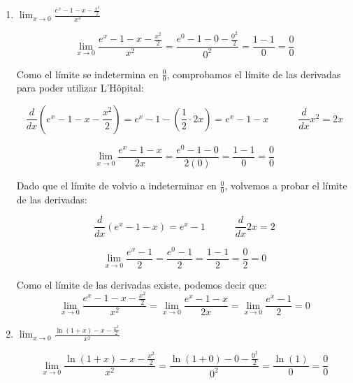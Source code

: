 \documentclass[12pt]{article}
\begin{document}
\begin{enumerate}[\hspace{9px} a)]
    \item \(\displaystyle\lim_{x \to 0}\frac{e^x-1-x-\frac{x^2}{2}}{x^3}\)
    
        \begin{equation*}
            \lim_{x \to 0}\frac{e^x-1-x-\frac{x^2}{2}}{x^2} = \frac{e^0-1-0-\frac{0^2}{2}}{0^2} = \frac{1-1}{0} = \frac{0}{0}
        \end{equation*}

        Como el l\'imite se indetermina en \(\displaystyle\frac{0}{0}\), comprobamos el l\'imite de las derivadas para poder utilizar L'H\^opital:

        \begin{equation*}
            \frac{d}{dx}(e^x-1-x-\frac{x^2}{2}) = e^x-1-(\frac{1}{2}\cdot2x) = e^x-1-x \qquad \quad \frac{d}{dx}x^2=2x
        \end{equation*}

        \begin{equation*}
            \lim_{x \to 0}\frac{e^x-1-x}{2x} = \frac{e^0-1-0}{2(0)} = \frac{1-1}{0} = \frac{0}{0}
        \end{equation*}

        Dado que el l\'imite de volvio a indeterminar en \(\displaystyle\frac{0}{0}\), volvemos a probar el l\'imite de las derivadas:

        \begin{equation*}
            \frac{d}{dx}(e^x-1-x) = e^x-1 \qquad \quad \frac{d}{dx}2x = 2
        \end{equation*}

        \begin{equation*}
            \lim_{x \to 0}\frac{e^x-1}{2} = \frac{e^0-1}{2} = \frac{1-1}{2} = \frac{0}{2} = 0
        \end{equation*}

        Como el l\'imite de las derivadas existe, podemos decir que:
        \begin{equation*}
            \lim_{x \to 0}\frac{e^x-1-x-\frac{x^2}{2}}{x^2} = \lim_{x \to 0}\frac{e^x-1-x}{2x} = \lim_{x \to 0}\frac{e^x-1}{2} = 0
        \end{equation*}

    \item \(\displaystyle\lim_{x \to 0}\frac{\ln(1+x)-x-\frac{x^2}{2}}{x^2}\)
        
        \begin{equation*}
            \lim_{x \to 0}\frac{\ln(1+x)-x-\frac{x^2}{2}}{x^2} = \frac{\ln(1+0)-0-\frac{0^2}{2}}{0^2} = \frac{\ln(1)}{0} = \frac{0}{0}
        \end{equation*}


\end{enumerate}
\end{document}
